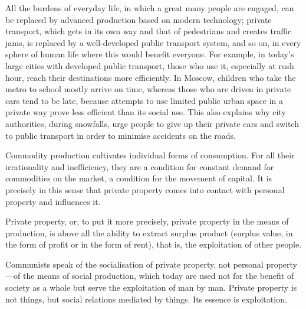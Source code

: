 \documentclass[../main]{subfiles}
\begin{document}
All the burdens of everyday life, in which a great many people are engaged, can be replaced by advanced production based on modern technology; private transport, which gets in its own way and that of pedestrians and creates traffic jams, is replaced by a well-developed public transport system, and so on, in every sphere of human life where this would benefit everyone. For example, in today's large cities with developed public transport, those who use it, especially at rush hour, reach their destinations more efficiently. In Moscow, children who take the metro to school mostly arrive on time, whereas those who are driven in private cars tend to be late, because attempts to use limited public urban space in a private way prove less efficient than its social use. This also explains why city authorities, during snowfalls, urge people to give up their private cars and switch to public transport in order to minimise accidents on the roads.

Commodity production cultivates individual forms of consumption. For all their irrationality and inefficiency, they are a condition for constant demand for commodities on the market, a condition for the movement of capital. It is precisely in this sense that private property comes into contact with personal property and influences it.

Private property, or, to put it more precisely, private property in the means of production, is above all the ability to extract surplus product (surplus value, in the form of profit or in the form of rent), that is, the exploitation of other people.

Communists speak of the socialisation of private property, not personal property—of the means of social production, which today are used not for the benefit of society as a whole but serve the exploitation of man by man. Private property is not things, but social relations mediated by things. Its essence is exploitation.
\end{document}
